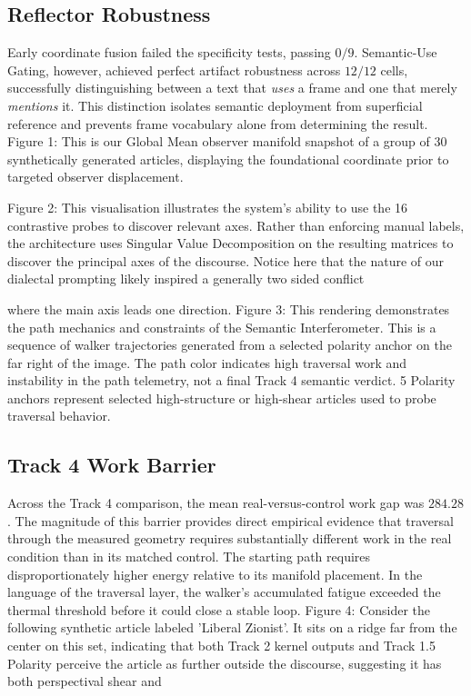 \subsection{Reflector Robustness}
Early coordinate fusion failed the specificity tests, passing $0/9$. Semantic-Use Gating, however, achieved perfect artifact robustness across $12/12$ cells, successfully distinguishing between a text that \textit{uses} a frame and one that merely \textit{mentions} it. This distinction isolates semantic deployment from superficial reference and prevents frame vocabulary alone from determining the result.
Figure 1: This is our Global Mean observer manifold snapshot of a group of 30 synthetically
generated articles, displaying the foundational coordinate prior to targeted observer
displacement.

Figure 2: This visualisation illustrates the system's ability to use the 16 contrastive probes to
discover relevant axes. Rather than enforcing manual labels, the architecture uses Singular Value
Decomposition on the resulting matrices to discover the principal axes of the discourse. Notice
here that the nature of our dialectal prompting likely inspired a generally two sided conflict

where the main axis leads one direction.
Figure 3: This rendering demonstrates the path mechanics and constraints of the Semantic
Interferometer. This is a sequence of walker trajectories generated from a selected polarity
anchor on the far right of the image. The path color indicates high traversal work and instability
in the path telemetry, not a final Track 4 semantic verdict.
5 Polarity anchors represent selected high-structure or high-shear articles used to probe traversal behavior.

\subsection{Track 4 Work Barrier}
Across the Track 4 comparison, the mean real-versus-control work gap was $284.28$. The magnitude of this barrier provides direct empirical evidence that traversal through the measured geometry requires substantially different work in the real condition than in its matched control.
The starting path requires disproportionately higher energy relative to its manifold placement. In
the language of the traversal layer, the walker's accumulated fatigue exceeded the thermal
threshold before it could close a stable loop.
Figure 4: Consider the following synthetic article labeled 'Liberal Zionist'. It sits on a ridge far
from the center on this set, indicating that both Track 2 kernel outputs and Track 1.5 Polarity
perceive the article as further outside the discourse, suggesting it has both perspectival shear and

